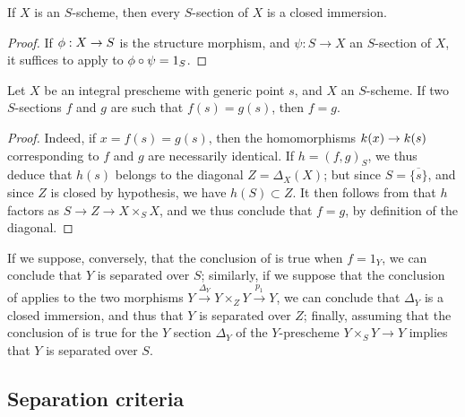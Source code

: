 \begin{cor}[5.4.6]
\label{1.5.4.6}
If $X$ is an $S$-scheme, then every $S$-section of $X$  is a closed immersion.
\end{cor}

\begin{proof}
\label{proof-1.5.4.6}
If $\vphi:X\to S$ is the structure morphism, and $\psi:S\to X$ an $S$-section of $X$, it suffices to apply  to $\phi\circ\psi=1_S$.
\end{proof}

\begin{cor}[5.4.7]
\label{1.5.4.7}
Let $X$ be an integral prescheme with generic point $s$, and $X$ an $S$-scheme.
If two $S$-sections $f$ and $g$ are such that $f(s)=g(s)$, then $f=g$.
\end{cor}

\begin{proof}
\label{proof-1.5.4.7}
Indeed, if $x=f(s)=g(s)$, then the homomorphisms $\kres(x)\to\kres(s)$ corresponding to $f$ and $g$ are necessarily identical.
If $h=(f,g)_S$, we thus deduce  that $h(s)$ belongs to the diagonal $Z=\Delta_X(X)$;
but since $S=\overline{\{s\}}$, and since $Z$ is closed by hypothesis, we have $h(S)\subset Z$.
It then follows from  that $h$ factors as $S\to Z\to X\times_S X$, and we thus conclude that $f=g$, by definition of the diagonal.
\end{proof}

\begin{rmk}[5.4.8]
\label{1.5.4.8}
If we suppose, conversely, that the conclusion of  is true when $f=1_Y$, we can conclude that $Y$ is separated over $S$;
similarly, if we suppose that the conclusion of  applies to the two morphisms $Y\xrightarrow{\Delta_Y}Y\times_Z Y\xrightarrow{p_1}Y$, we can conclude that $\Delta_Y$ is a closed immersion, and thus that $Y$ is separated over $Z$;
finally, assuming that the conclusion of  is true for the $Y$ section $\Delta_Y$ of the $Y$-prescheme $Y\times_S Y\to Y$ implies that $Y$ is separated over $S$.
\end{rmk}

\subsection{Separation criteria}
\label{subsection:separation-criteria}

